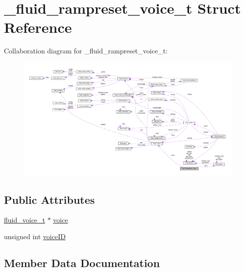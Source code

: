 \hypertarget{struct__fluid__rampreset__voice__t}{}\section{\+\_\+fluid\+\_\+rampreset\+\_\+voice\+\_\+t Struct Reference}
\label{struct__fluid__rampreset__voice__t}


Collaboration diagram for \+\_\+fluid\+\_\+rampreset\+\_\+voice\+\_\+t\+:
\nopagebreak
\begin{figure}[H]
\begin{center}
\leavevmode
\includegraphics[width=350pt]{struct__fluid__rampreset__voice__t__coll__graph}
\end{center}
\end{figure}
\subsection*{Public Attributes}
\begin{DoxyCompactItemize}
\item 
\hyperlink{types_8h_a5123ae5ef2d7806475267380c33604c3}{fluid\+\_\+voice\+\_\+t} $\ast$ \hyperlink{struct__fluid__rampreset__voice__t_a18ab3e0ea68a75013dfa77193a8a8c07}{voice}
\item 
unsigned int \hyperlink{struct__fluid__rampreset__voice__t_a82f4c1aadddb3c702648ac7b89be5649}{voice\+ID}
\end{DoxyCompactItemize}


\subsection{Member Data Documentation}
\mbox{\label{struct__fluid__rampreset__voice__t_a18ab3e0ea68a75013dfa77193a8a8c07}} 
